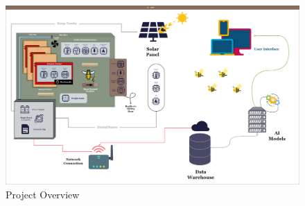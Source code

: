 \documentclass[12pt]{article}
\begin{document}
	\begin{figure}[H]
		\centering
		\includegraphics[width=\textwidth]{Images/Diagrams/System Overview.png}
		\caption{Project Overview}
		\label{fig:PROJECT_OVERVIEW}
	\end{figure}
	\vspace{1.5 cm}
\end{document}
